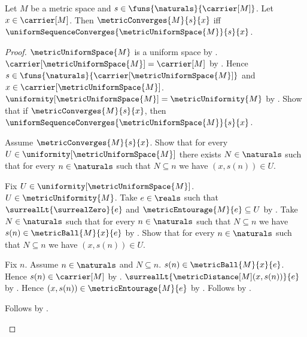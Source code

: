 \begin{theorem}\label{metric_uniform_sequence_convergence_iff}
    Let $M$ be a metric space and
        $s\in\funs{\naturals}{\carrier[M]}$.
    Let $x\in\carrier[M]$.
    Then
        $\metricConverges{M}{s}{x}$ iff
        $\uniformSequenceConverges{\metricUniformSpace{M}}{s}{x}$.
\end{theorem}
\begin{proof}
    $\metricUniformSpace{M}$ is a uniform space by
        .
    $\carrier[\metricUniformSpace{M}]=\carrier[M]$
        by .
    Hence $s\in\funs{\naturals}
        {\carrier[\metricUniformSpace{M}]}$ and
        $x\in\carrier[\metricUniformSpace{M}]$.
    $\uniformity[\metricUniformSpace{M}]=\metricUniformity{M}$
        by .
    Show that if $\metricConverges{M}{s}{x}$, then
        $\uniformSequenceConverges{\metricUniformSpace{M}}{s}{x}$.
    \begin{subproof}
        Assume $\metricConverges{M}{s}{x}$.
        Show that for every
            $U\in\uniformity[\metricUniformSpace{M}]$ there exists
            $N\in\naturals$ such that for every $n\in\naturals$ such that
            $N\subseteq n$ we have $(x,s(n))\in U$.
        \begin{subproof}
            Fix $U\in\uniformity[\metricUniformSpace{M}]$.
            $U\in\metricUniformity{M}$.
            Take $e\in\reals$ such that
                $\surrealLt{\surrealZero}{e}$ and
                $\metricEntourage{M}{e}\subseteq U$
                by .
            Take $N\in\naturals$ such that for every $n\in\naturals$
                such that $N\subseteq n$ we have
                $s(n)\in\metricBall{M}{x}{e}$
                by .
            Show that for every $n\in\naturals$ such that $N\subseteq n$
                we have $(x,s(n))\in U$.
            \begin{subproof}
                Fix $n$.
                Assume $n\in\naturals$ and $N\subseteq n$.
                $s(n)\in\metricBall{M}{x}{e}$.
                Hence $s(n)\in\carrier[M]$ by .
                $\surrealLt{\metricDistance[M](x,s(n))}{e}$
                    by .
                Hence $(x,s(n))\in\metricEntourage{M}{e}$
                    by .
                Follows by .
            \end{subproof}
            Follows by \auto.

\end{subproof}
\end{subproof}
\end{proof}
